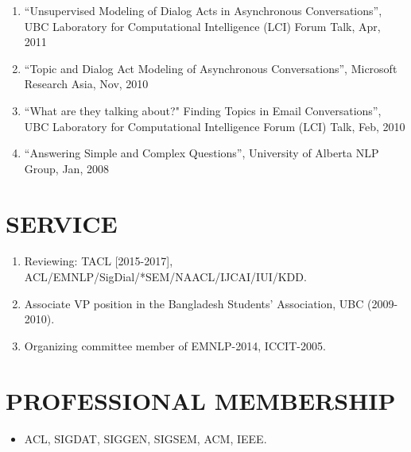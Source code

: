 \documentclass[paper=letter,fontsize=11pt]{scrartcl} %
\newcommand{\NewPart}[2]{\section*{\uppercase{#1} #2}}
\newcommand{\TalkEntry}[4]{
		\noindent #1, #2, #3 #4}
\begin{document}
\begin{enumerate}
\item\TalkEntry{``Unsupervised Modeling of Dialog Acts in Asynchronous Conversations''} {UBC Laboratory for Computational Intelligence (LCI) Forum Talk}{Apr, 2011}{}

\item\TalkEntry{``Topic and Dialog Act Modeling of Asynchronous Conversations''} {Microsoft Research Asia}{Nov, 2010}{}

\item\TalkEntry{``What are they talking about?" Finding Topics in Email Conversations''} {UBC Laboratory for Computational Intelligence Forum (LCI) Talk}{Feb, 2010}{}

\item\TalkEntry{``Answering Simple and Complex Questions''} {University of Alberta NLP Group}{Jan, 2008}{}

\end{enumerate}

\NewPart{Service}{}

\begin{enumerate}
\item Reviewing: TACL [2015-2017], ACL/EMNLP/SigDial/*SEM/NAACL/IJCAI/IUI/KDD.
\item Associate VP position in the Bangladesh Students’ Association, UBC (2009-2010).
\item Organizing committee member of EMNLP-2014, ICCIT-2005.
\end{enumerate}

\NewPart{Professional Membership}{}

\begin{itemize}
\item ACL, SIGDAT, SIGGEN, SIGSEM, ACM, IEEE.
\end{itemize}


\end{document}
